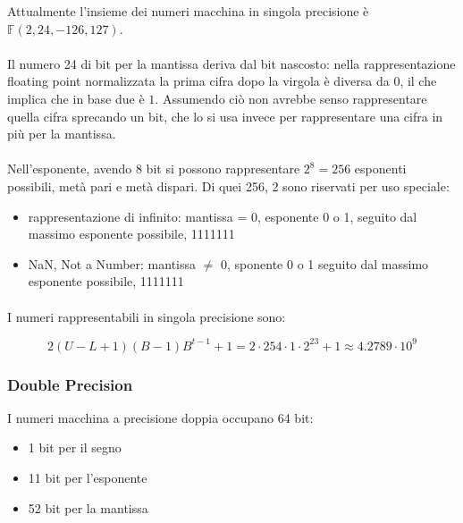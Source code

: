 \documentclass[a4paper, 11pt]{article}
\begin{document}
            Attualmente l'insieme dei numeri macchina in singola precisione è $\mathbb{F}(2, 24, -126, 127)$.

            \paragraph{}
            Il numero 24 di bit per la mantissa deriva dal bit nascosto: nella rappresentazione floating point normalizzata la prima cifra dopo la virgola è diversa da $0$, il che implica che in base due è $1$. Assumendo ciò non avrebbe senso rappresentare quella cifra sprecando un bit, che lo si usa invece per rappresentare una cifra in più per la mantissa.  

            \paragraph{}
            Nell'esponente, avendo 8 bit si possono rappresentare $2^8 = 256$ esponenti possibili, metà pari e metà dispari.
            Di quei 256, 2 sono riservati per uso speciale: 

            \begin{itemize}
                \item rappresentazione di infinito: mantissa = 0, esponente 0 o 1, seguito dal massimo esponente possibile, 1111111 
                \item NaN, Not a Number: mantissa $\neq$ 0, sponente 0 o 1 seguito dal massimo esponente possibile, 1111111
            \end{itemize}

            \paragraph{}
            I numeri rappresentabili in singola precisione sono:


            \[
                2(U-L+1)(B-1)B^{t-1}+1 = 2\cdot254\cdot1\cdot2^{23} + 1 \approx 4.2789 \cdot 10^9
            \]



            \subsubsection{Double Precision}

            I numeri macchina a precisione doppia occupano 64 bit: 

            \begin{itemize}
                \item 1 bit per il segno
                \item 11 bit per l'esponente
                \item 52 bit per la mantissa
            \end{itemize}
            
\end{document}
